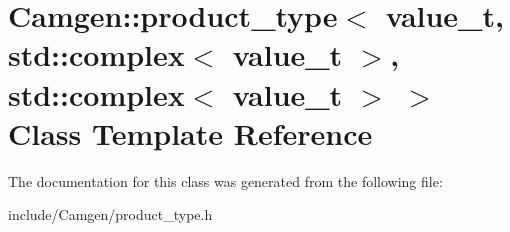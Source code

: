 \hypertarget{a00433}{\section{Camgen\-:\-:product\-\_\-type$<$ value\-\_\-t, std\-:\-:complex$<$ value\-\_\-t $>$, std\-:\-:complex$<$ value\-\_\-t $>$ $>$ Class Template Reference}
\label{a00433}
}


The documentation for this class was generated from the following file\-:\begin{DoxyCompactItemize}
\item 
include/\-Camgen/product\-\_\-type.\-h\end{DoxyCompactItemize}
